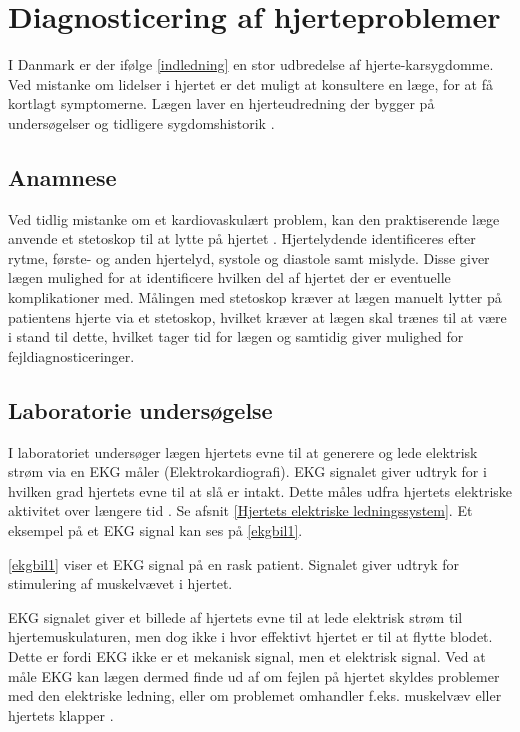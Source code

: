 \section{Diagnosticering af hjerteproblemer}

I Danmark er der ifølge \ref{indledning}  en stor udbredelse af hjerte-karsygdomme. Ved mistanke om lidelser i hjertet er det muligt at konsultere en læge, for at få kortlagt symptomerne. Lægen laver en hjerteudredning der bygger på undersøgelser og tidligere sygdomshistorik \cite{hjerud}.

\subsection{Anamnese}
Ved tidlig mistanke om et kardiovaskulært problem, kan den praktiserende læge anvende et stetoskop til at lytte på hjertet \cite{subob}. Hjertelydende identificeres efter rytme, første- og anden hjertelyd, systole og diastole samt mislyde. Disse giver lægen mulighed for at identificere hvilken del af hjertet der er eventuelle komplikationer med. Målingen med stetoskop kræver at lægen manuelt lytter på patientens hjerte via et stetoskop, hvilket kræver at lægen skal trænes til at være i stand til dette, hvilket tager tid for lægen og samtidig giver mulighed for fejldiagnosticeringer. 

\subsection{Laboratorie undersøgelse}
I laboratoriet undersøger lægen hjertets evne til at generere og lede elektrisk strøm via en EKG måler (Elektrokardiografi). EKG signalet giver udtryk for i hvilken grad hjertets evne til at slå er intakt. Dette måles udfra hjertets elektriske aktivitet over længere tid \cite{ekg}. Se afsnit \ref{Hjertets elektriske ledningssystem}. Et eksempel på et EKG signal kan ses på \ref{ekgbil1}. 

\label{ekgbil1}
\ref{ekgbil1} viser et EKG signal på en rask patient. Signalet giver udtryk for stimulering af muskelvævet i hjertet. 

EKG signalet giver et billede af hjertets evne til at lede elektrisk strøm til hjertemuskulaturen, men dog ikke i hvor effektivt hjertet er til at flytte blodet. Dette er fordi EKG ikke er et mekanisk signal, men et elektrisk signal. Ved at måle EKG kan lægen dermed finde ud af om fejlen på hjertet skyldes problemer med den elektriske ledning, eller om problemet omhandler f.eks. muskelvæv eller hjertets klapper \cite{ekg}. 

